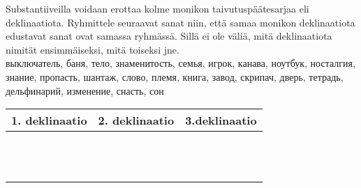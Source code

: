 \documentclass[paper=a4, fontsize=11pt]{scrartcl}
\begin{document}
\underline{\hspace{\textwidth}} \\
\underline{\hspace{\textwidth}} \\
\underline{\hspace{\textwidth}} \\


\section{} 

Substantiiveilla voidaan erottaa kolme monikon taivutuspäätesarjaa eli
deklinaatiota. Ryhmittele seuraavat sanat niin, että samaa monikon
deklinaatiota edustavat sanat ovat samassa ryhmässä. Sillä ei ole väliä, mitä
deklinaatiota nimität ensimmäiseksi, mitä toiseksi jne.\\[.5cm]

выключатель, баня, тело, знаменитость, семья, игрок, канава, ноутбук,
носталгия, знание, пропасть, шантаж, слово, племя, книга, завод, скрипач,
дверь, тетрадь, дельфинарий, изменение, снасть, сон\\[.5cm]

\begin{tabular}[C]{p{5cm}|p{5cm}|p{5cm}}
1. deklinaatio & 2. deklinaatio & 3.deklinaatio  \\ \toprule
               &                &                \\
               &                &                \\
               &                &                \\
               &                &                \\
               &                &                \\
               &                &                \\
               &                &                \\
               &                &                \\
               &                &                \\
               &                &                \\
               &                &                \\
               &                &                \\ \bottomrule
\end{tabular}
\end{document}

